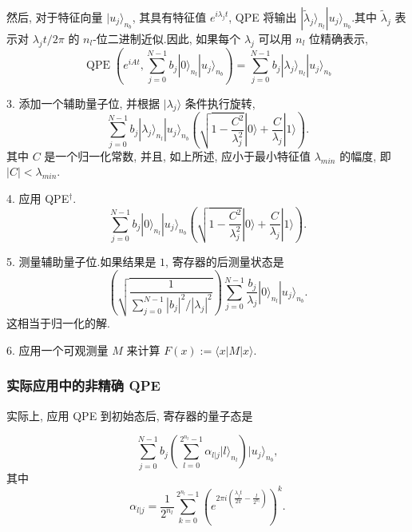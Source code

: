 然后, 对于特征向量 $|u_{j}\rangle_{n_{b}}$, 其具有特征值 $e^{i\lambda_{j}t}$, QPE 将输出 $|\tilde{\lambda}_{j}\rangle_{n_{l}}|u_{j}\rangle_{n_{b}}$.其中 $\tilde{\lambda}_{j}$ 表示对 $\lambda_{j}t / 2\pi$ 的 $n_{l}$-位二进制近似.因此, 如果每个 $\lambda_{j}$ 可以用 $n_{l}$ 位精确表示, 
\begin{equation}
	\operatorname{QPE}(e^{iAt}, \sum_{j=0}^{N-1}b_{j}|0\rangle_{n_{l}}|u_{j}\rangle_{n_{b}}) = \sum_{j=0}^{N-1}b_{j}|\lambda_{j}\rangle_{n_{l}}|u_{j}\rangle_{n_{b}}
\end{equation}\par
3. 添加一个辅助量子位, 并根据 $|\lambda_{ j }\rangle$ 条件执行旋转, 
\begin{equation} 
	\sum_{j=0}^{N-1} b _ { j } |\lambda _ { j }\rangle_{n_{l}}|u_{j}\rangle_{n_{b}} \left( \sqrt { 1 - \frac { C^{2}  } { \lambda _ { j } ^ { 2 } } } |0\rangle + \frac { C } { \lambda _ { j } } |1\rangle \right).
\end{equation}
其中 $C$ 是一个归一化常数, 并且, 如上所述, 应小于最小特征值 $\lambda_{min}$ 的幅度, 即 $|C| < \lambda_{min}$.\par
4. 应用 QPE$^{\dagger}$.
\begin{equation}
	\sum_{j=0}^{N-1} b _ { j } |0\rangle_{n_{l}}|u_{j}\rangle_{n_{b}} \left( \sqrt { 1 - \frac {C^{2}  } { \lambda _ { j } ^ { 2 } } } |0\rangle + \frac { C } { \lambda _ { j } } |1\rangle \right) .
\end{equation}\par
5. 测量辅助量子位.如果结果是 $1$, 寄存器的后测量状态是
\begin{equation}
	\left( \sqrt { \frac { 1 } { \sum_{j=0}^{N-1} \left| b _ { j } \right| ^ { 2 } / \left| \lambda _ { j } \right| ^ { 2 } } } \right) \sum _{j=0}^{N-1} \frac{b _ { j }}{\lambda _ { j }} |0\rangle_{n_{l}}|u_{j}\rangle_{n_{b}}.
\end{equation}
这相当于归一化的解.\par
6. 应用一个可观测量 $M$ 来计算 $F(x):=\langle x|M|x\rangle$.

\subsubsection{实际应用中的非精确 QPE}

实际上, 应用 QPE 到初始态后, 寄存器的量子态是

\begin{equation}
	\sum_{j=0}^{N-1} b_{j} \left(\sum_{l=0}^{2^{n_{l}}-1}\alpha_{l|j}|l\rangle_{n_{l}}\right)|u_{j}\rangle_{n_{b}},
\end{equation}
其中
$$
\alpha_{l|j} = \frac{1}{2^{n_{l}}}\sum_{k=0}^{2^{n_{l}}-1}\left(e^{2\pi i\left(\frac{\lambda_{j}t}{2\pi}-\frac{l}{2^{n_{l}}}\right)}\right)^{k}.
$$

